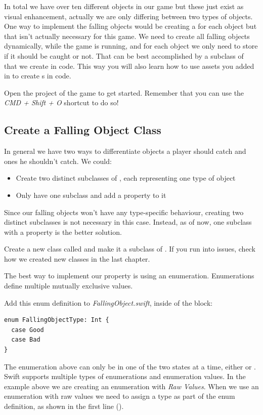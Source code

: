 In total we have over ten different objects in our game but these just exist as
visual enhancement, actually we are only differing between two types of objects.
One way to implement the falling objects would be creating a \ccbfile{} for each
object but that isn't actually necessary for this game. We need to create all
falling objects dynamically, while the game is running, and for each object we
only need to store if it should be caught or not. That can be best accomplished
by a subclass of \ccsprite{} that we create in code. This way you will also
learn how to use assets you added in \SB{} to create \ccsprite{}s in code.
\begin{leftbar}
Open the \xcode{} project of the game to get started. Remember that you can use
the \textit{CMD + Shift + O} shortcut to do so!
\end{leftbar}

\subsection{Create a Falling Object Class}
In general we have two ways to differentiate objects a player should catch and
ones he shouldn't catch. We could:
\begin{itemize}
  \item Create two distinct subclasses of \ccsprite{}, each representing one
  type of object
  \item Only have one subclass and add a  property to it
\end{itemize}
Since our falling objects won't have any type-specific behaviour, creating two
distinct subclasses is not necessary in this case. Instead, as of now, one
subclass with a  property is the better solution.

\begin{leftbar}
Create a new class called  and make it a subclass
of \ccsprite{}. If you run into issues, check how we created new classes in the
last chapter.
\end{leftbar}

The best way to implement our  property is using an 
enumeration. Enumerations define multiple mutually exclusive values.

\begin{leftbar}
Add this enum definition to \textit{FallingObject.swift},
inside of the  block:

\begin{lstlisting}
enum FallingObjectType: Int {
  case Good
  case Bad
}
\end{lstlisting}
\end{leftbar}
The enumeration above can only be in one of the two states at a time, either
 or . Swift supports multiple types of
enumerations and enumeration values.
In the example above we are creating an enumeration with \textit{Raw Values}.
When we use an enumeration with raw values we need to assign a type as part of
the enum definition, as shown in the first line (). 

